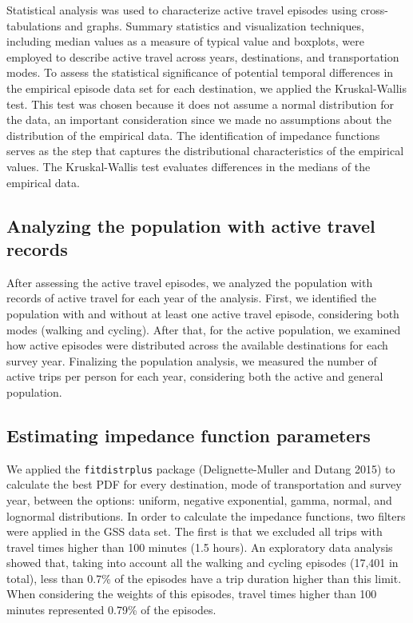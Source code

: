 \documentclass[preprint, 3p,
authoryear]{elsarticle} %
\begin{document}
Statistical analysis was used to characterize active travel episodes
using cross-tabulations and graphs. Summary statistics and visualization
techniques, including median values as a measure of typical value and
boxplots, were employed to describe active travel across years,
destinations, and transportation modes. To assess the statistical
significance of potential temporal differences in the empirical episode
data set for each destination, we applied the Kruskal-Wallis test. This
test was chosen because it does not assume a normal distribution for the
data, an important consideration since we made no assumptions about the
distribution of the empirical data. The identification of impedance
functions serves as the step that captures the distributional
characteristics of the empirical values. The Kruskal-Wallis test
evaluates differences in the medians of the empirical data.

\hypertarget{analyzing-the-population-with-active-travel-records}{%
\subsection{Analyzing the population with active travel
records}\label{analyzing-the-population-with-active-travel-records}}

After assessing the active travel episodes, we analyzed the population
with records of active travel for each year of the analysis. First, we
identified the population with and without at least one active travel
episode, considering both modes (walking and cycling). After that, for
the active population, we examined how active episodes were distributed
across the available destinations for each survey year. Finalizing the
population analysis, we measured the number of active trips per person
for each year, considering both the active and general population.

\hypertarget{estimating-impedance-function-parameters}{%
\subsection{Estimating impedance function
parameters}\label{estimating-impedance-function-parameters}}

We applied the \texttt{fitdistrplus} package (Delignette-Muller and
Dutang 2015) to calculate the best PDF for every destination, mode of
transportation and survey year, between the options: uniform, negative
exponential, gamma, normal, and lognormal distributions. In order to
calculate the impedance functions, two filters were applied in the GSS
data set. The first is that we excluded all trips with travel times
higher than 100 minutes (1.5 hours). An exploratory data analysis showed
that, taking into account all the walking and cycling episodes (17,401
in total), less than 0.7\% of the episodes have a trip duration higher
than this limit. When considering the weights of this episodes, travel
times higher than 100 minutes represented 0.79\% of the episodes.
\end{document}
